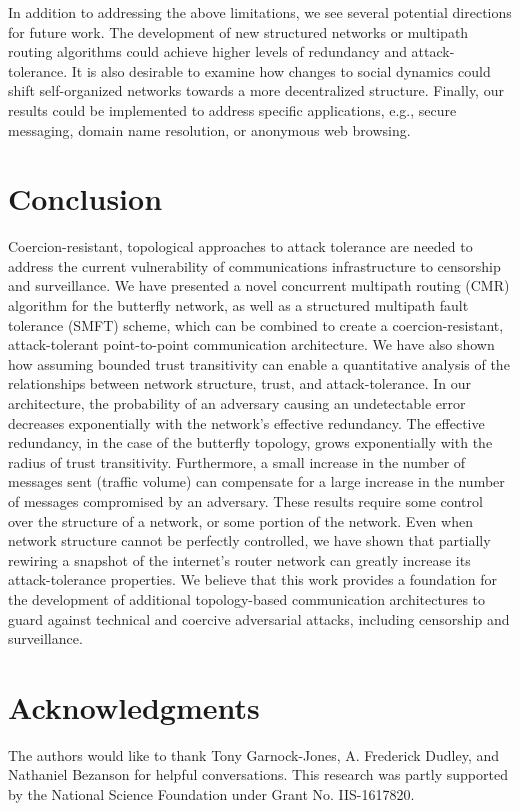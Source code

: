 \documentclass[10pt,letterpaper]{article}
\begin{document}
In addition to addressing the above limitations,
we see several potential directions for future work.
The development of new structured networks or multipath routing algorithms
could achieve higher levels of redundancy and attack-tolerance.
It is also desirable to examine how changes to social dynamics could shift
self-organized networks towards a more decentralized structure.
Finally, our results could be implemented to address specific applications, e.g.,
secure messaging, domain name resolution, or anonymous web browsing.

\section*{Conclusion}
\label{sec-conclusion}

Coercion-resistant, topological approaches to attack tolerance are needed to
address the current vulnerability of communications infrastructure to
censorship and surveillance.
We have presented a novel concurrent multipath routing (CMR)
algorithm for the butterfly network,
as well as a structured multipath fault tolerance (SMFT) scheme,
which can be combined to create a coercion-resistant,
attack-tolerant point-to-point communication architecture.
We have also shown how assuming bounded trust
transitivity can enable a quantitative analysis of the
relationships between network structure, trust, and attack-tolerance.
In our architecture,
the probability of an adversary causing an undetectable error
decreases exponentially with the network's effective redundancy.
The effective redundancy, in the case of the butterfly topology,
grows exponentially with the radius of trust transitivity.
Furthermore, a small increase in the number of messages sent
(traffic volume) can compensate
for a large increase in the number of messages compromised by an adversary.
These results require some control over the structure of a network,
or some portion of the network.
Even when network structure cannot be perfectly controlled,
we have shown that partially rewiring a snapshot of the internet's router network
can greatly increase its attack-tolerance properties.
We believe that this work provides a foundation for the
development of additional topology-based communication
architectures to guard against technical and coercive adversarial attacks,
including censorship and surveillance.

\section*{Acknowledgments}
The authors would like to thank Tony Garnock-Jones, A. Frederick Dudley, and
Nathaniel Bezanson for helpful conversations.
This research was partly supported by the National Science Foundation under
Grant No. IIS-1617820.
\end{document}
